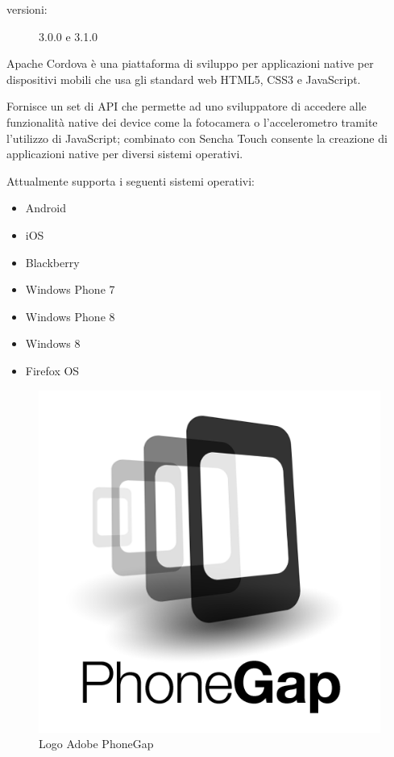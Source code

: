 \begin{description}
\item[versioni:] 3.0.0 e 3.1.0
\end{description}

Apache Cordova è una piattaforma di sviluppo per applicazioni native per dispositivi mobili che usa gli standard web \acs{HTML5}, \acs{CSS3} e JavaScript.

Fornisce un set di \ac{API} che permette ad uno sviluppatore di accedere alle funzionalità native dei device come la fotocamera o l'accelerometro tramite l'utilizzo di JavaScript; combinato con Sencha Touch consente la creazione di applicazioni native per diversi sistemi operativi.

Attualmente supporta i seguenti sistemi operativi:
\begin{itemize}
\item Android
\item iOS
\item Blackberry
\item Windows Phone 7
\item Windows Phone 8
\item Windows 8
\item Firefox OS
\end{itemize}

\begin{figure}[htb]
\centering
\includegraphics[scale=0.25]{gfx/PhoneGap}
\caption{Logo Adobe PhoneGap}
\label{fig: logo phonegap}
\end{figure}

